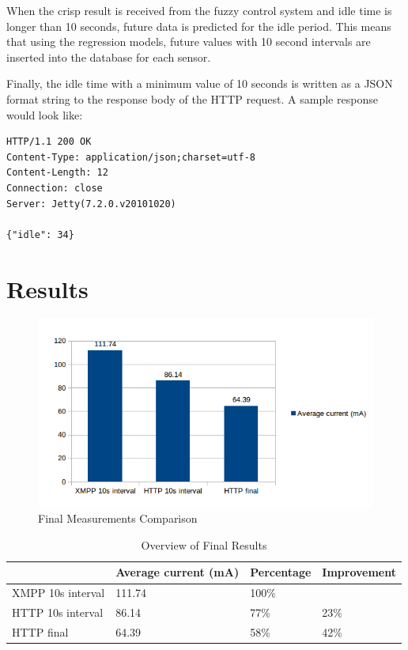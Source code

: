 When the crisp result is received from the fuzzy control system and idle time is longer than 10 seconds, future data is predicted for the idle period. This means that using the regression models, future values with 10 second intervals are inserted into the database for each sensor. 

Finally, the idle time with a minimum value of 10 seconds is written as a JSON format string to the response body of the HTTP request. A sample response would look like:

\begin{lstlisting}
HTTP/1.1 200 OK
Content-Type: application/json;charset=utf-8
Content-Length: 12
Connection: close
Server: Jetty(7.2.0.v20101020)

{"idle": 34}
\end{lstlisting}


\section{Results}

\begin{figure}[h!]
\centering
\includegraphics[scale=1]{4/figures/final_measurements.png}
\caption{Final Measurements Comparison}
\label{final_measurements}
\end{figure}

\begin{table}[h]
\centering
  \begin{tabular}{|l|l|l|l|}
    \hline
     & Average current (mA) & Percentage & Improvement \\ \hline
    XMPP 10s interval & 111.74 & 100\% & \\ \hline
    HTTP 10s interval & 86.14 & 77\% & 23\% \\ \hline
    HTTP final & 64.39 & 58\% & 42\% \\
    \hline
  \end{tabular}
\caption{Overview of Final Results}
\label{table}
\end{table}

